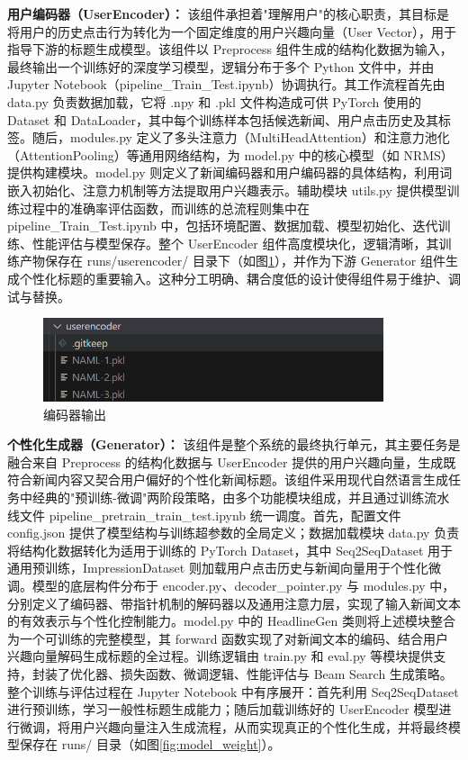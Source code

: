 \documentclass[10pt,a4paper]{article}
\begin{document}
\textbf{用户编码器（UserEncoder）：}
该组件承担着"理解用户"的核心职责，其目标是将用户的历史点击行为转化为一个固定维度的用户兴趣向量（User Vector），用于指导下游的标题生成模型。该组件以 Preprocess 组件生成的结构化数据为输入，最终输出一个训练好的深度学习模型，逻辑分布于多个 Python 文件中，并由 Jupyter Notebook（pipeline\_Train\_Test.ipynb）协调执行。其工作流程首先由 data.py 负责数据加载，它将 .npy 和 .pkl 文件构造成可供 PyTorch 使用的 Dataset 和 DataLoader，其中每个训练样本包括候选新闻、用户点击历史及其标签。随后，modules.py 定义了多头注意力（MultiHeadAttention）和注意力池化（AttentionPooling）等通用网络结构，为 model.py 中的核心模型（如 NRMS）提供构建模块。model.py 则定义了新闻编码器和用户编码器的具体结构，利用词嵌入初始化、注意力机制等方法提取用户兴趣表示。辅助模块 utils.py 提供模型训练过程中的准确率评估函数，而训练的总流程则集中在 pipeline\_Train\_Test.ipynb 中，包括环境配置、数据加载、模型初始化、迭代训练、性能评估与模型保存。整个 UserEncoder 
组件高度模块化，逻辑清晰，其训练产物保存在 runs/userencoder/ 目录下（如图\ref{fig:user_encode}），并作为下游 Generator 组件生成个性化标题的重要输入。这种分工明确、耦合度低的设计使得组件易于维护、调试与替换。

\begin{figure}[H]
  \centering
  \includegraphics[width=10cm]{fig/user_encode.png}
  \caption{编码器输出}\label{fig:user_encode}
\end{figure}

\textbf{个性化生成器（Generator）：}
该组件是整个系统的最终执行单元，其主要任务是融合来自 Preprocess 的结构化数据与 UserEncoder 提供的用户兴趣向量，生成既符合新闻内容又契合用户偏好的个性化新闻标题。该组件采用现代自然语言生成任务中经典的"预训练-微调"两阶段策略，由多个功能模块组成，并且通过训练流水线文件 pipeline\_pretrain\_train\_test.ipynb 统一调度。首先，配置文件 config.json 提供了模型结构与训练超参数的全局定义；数据加载模块 data.py 负责将结构化数据转化为适用于训练的 PyTorch Dataset，其中 Seq2SeqDataset 用于通用预训练，ImpressionDataset 则加载用户点击历史与新闻向量用于个性化微调。模型的底层构件分布于 encoder.py、decoder\_pointer.py 与 modules.py 中，分别定义了编码器、带指针机制的解码器以及通用注意力层，实现了输入新闻文本的有效表示与个性化控制能力。model.py 中的 HeadlineGen 类则将上述模块整合为一个可训练的完整模型，其 forward 函数实现了对新闻文本的编码、结合用户兴趣向量解码生成标题的全过程。训练逻辑由 train.py 和 eval.py 等模块提供支持，封装了优化器、损失函数、微调逻辑、性能评估与 Beam Search 生成策略。整个训练与评估过程在 Jupyter Notebook 中有序展开：首先利用 Seq2SeqDataset 进行预训练，学习一般性标题生成能力；随后加载训练好的 UserEncoder 模型进行微调，将用户兴趣向量注入生成流程，从而实现真正的个性化生成，并将最终模型保存在 runs/ 目录（如图\ref{fig:model_weight}）。
\end{document}
